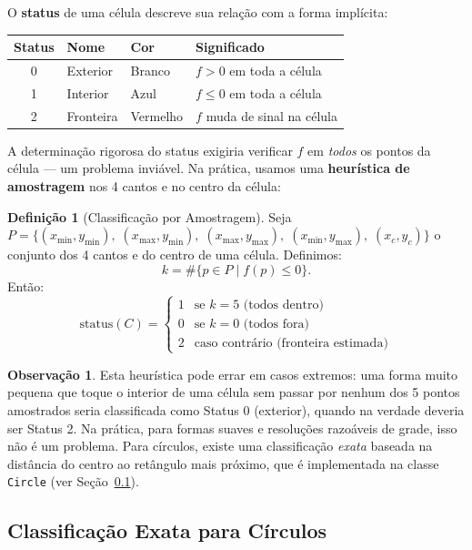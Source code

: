 \documentclass[11pt,a4paper]{article}
\theoremstyle{plain}
\theoremstyle{definition}
\newtheorem{definition}[theorem]{Definição}
\newtheorem{remark}[theorem]{Observação}
\begin{document}
O \textbf{status} de uma célula descreve sua relação com a forma implícita:

\begin{center}
\begin{tabular}{clll}
\toprule
\textbf{Status} & \textbf{Nome} & \textbf{Cor} & \textbf{Significado} \\
\midrule
0 & Exterior & Branco & $f > 0$ em toda a célula \\
1 & Interior & Azul   & $f \leq 0$ em toda a célula \\
2 & Fronteira & Vermelho & $f$ muda de sinal na célula \\
\bottomrule
\end{tabular}
\end{center}

A determinação rigorosa do status exigiria verificar $f$ em \emph{todos} os
pontos da célula --- um problema inviável. Na prática, usamos uma
\textbf{heurística de amostragem} nos 4 cantos e no centro da célula:

\begin{definition}[Classificação por Amostragem]
Seja $P = \{ (x_{\min}, y_{\min}),\; (x_{\max}, y_{\min}),\; (x_{\max}, y_{\max}),\; (x_{\min}, y_{\max}),\; (x_c, y_c) \}$ o conjunto dos 4 cantos e do centro de uma célula. Definimos:
\[
    k = \#\{ p \in P \mid f(p) \leq 0 \}.
\]
Então:
\[
    \text{status}(C) = \begin{cases}
        1 & \text{se } k = 5 \text{ (todos dentro)} \\
        0 & \text{se } k = 0 \text{ (todos fora)} \\
        2 & \text{caso contrário (fronteira estimada)}
    \end{cases}
\]
\end{definition}

\begin{remark}
Esta heurística pode errar em casos extremos: uma forma muito pequena que toque
o interior de uma célula sem passar por nenhum dos 5 pontos amostrados seria
classificada como Status 0 (exterior), quando na verdade deveria ser Status 2.
Na prática, para formas suaves e resoluções razoáveis de grade, isso não é um
problema. Para círculos, existe uma classificação \emph{exata} baseada na
distância do centro ao retângulo mais próximo, que é implementada na classe
\texttt{Circle} (ver Seção~\ref{subsec:circle_exact}).
\end{remark}

\subsection{Classificação Exata para Círculos}
\label{subsec:circle_exact}
\end{document}
